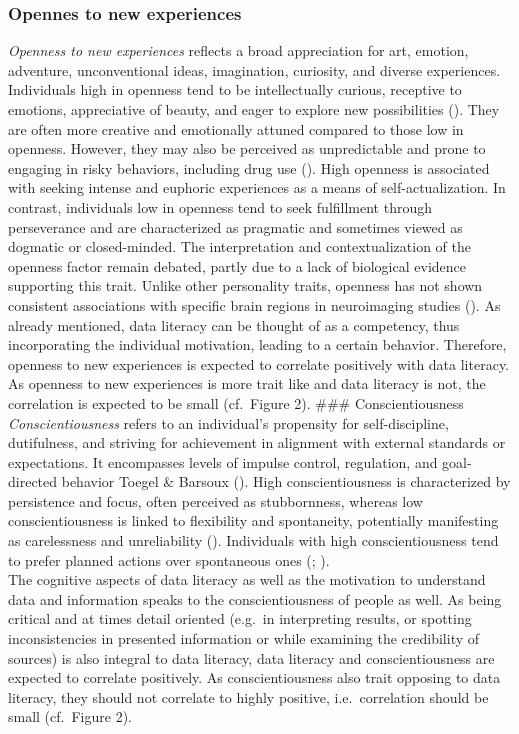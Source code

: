 \documentclass[
  12pt,
  a4paper,
  twoside]{article}
\begin{document}
\subsubsection{Opennes to new experiences}\label{opennes-to-new-experiences}

\emph{Openness to new experiences} reflects a broad appreciation for art, emotion, adventure, unconventional ideas, imagination, curiosity, and diverse experiences. Individuals high in openness tend to be intellectually curious, receptive to emotions, appreciative of beauty, and eager to explore new possibilities (). They are often more creative and emotionally attuned compared to those low in openness. However, they may also be perceived as unpredictable and prone to engaging in risky behaviors, including drug use (). High openness is associated with seeking intense and euphoric experiences as a means of self-actualization. In contrast, individuals low in openness tend to seek fulfillment through perseverance and are characterized as pragmatic and sometimes viewed as dogmatic or closed-minded. The interpretation and contextualization of the openness factor remain debated, partly due to a lack of biological evidence supporting this trait. Unlike other personality traits, openness has not shown consistent associations with specific brain regions in neuroimaging studies (). As already mentioned, data literacy can be thought of as a competency, thus incorporating the individual motivation, leading to a certain behavior. Therefore, openness to new experiences is expected to correlate positively with data literacy. As openness to new experiences is more trait like and data literacy is not, the correlation is expected to be small (cf.~Figure 2).
\#\#\# Conscientiousness
\emph{Conscientiousness} refers to an individual's propensity for self-discipline, dutifulness, and striving for achievement in alignment with external standards or expectations. It encompasses levels of impulse control, regulation, and goal-directed behavior Toegel \& Barsoux (). High conscientiousness is characterized by persistence and focus, often perceived as stubbornness, whereas low conscientiousness is linked to flexibility and spontaneity, potentially manifesting as carelessness and unreliability (). Individuals with high conscientiousness tend to prefer planned actions over spontaneous ones (; ).\\
The cognitive aspects of data literacy as well as the motivation to understand data and information speaks to the conscientiousness of people as well. As being critical and at times detail oriented (e.g.~in interpreting results, or spotting inconsistencies in presented information or while examining the credibility of sources) is also integral to data literacy, data literacy and conscientiousness are expected to correlate positively. As conscientiousness also trait opposing to data literacy, they should not correlate to highly positive, i.e.~correlation should be small (cf.~Figure 2).
\end{document}
